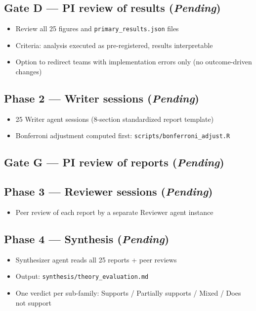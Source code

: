 \documentclass[12pt,a4paper]{article}
\begin{document}
\subsection*{Gate D --- PI review of results (\emph{Pending})}

\begin{itemize}
  \item Review all 25 figures and \texttt{primary\_results.json} files
  \item Criteria: analysis executed as pre-registered, results interpretable
  \item Option to redirect teams with implementation errors only
    (no outcome-driven changes)
\end{itemize}

\subsection*{Phase 2 --- Writer sessions (\emph{Pending})}

\begin{itemize}
  \item 25 Writer agent sessions (8-section standardized report template)
  \item Bonferroni adjustment computed first: \texttt{scripts/bonferroni\_adjust.R}
\end{itemize}

\subsection*{Gate G --- PI review of reports (\emph{Pending})}

\subsection*{Phase 3 --- Reviewer sessions (\emph{Pending})}

\begin{itemize}
  \item Peer review of each report by a separate Reviewer agent instance
\end{itemize}

\subsection*{Phase 4 --- Synthesis (\emph{Pending})}

\begin{itemize}
  \item Synthesizer agent reads all 25 reports + peer reviews
  \item Output: \texttt{synthesis/theory\_evaluation.md}
  \item One verdict per sub-family: Supports / Partially supports / Mixed / Does not support
\end{itemize}
\end{document}
